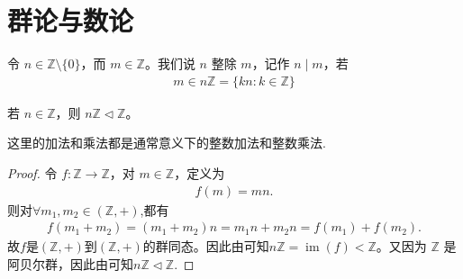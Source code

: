 \documentclass[../../main.tex]{subfiles}
\begin{document}
\section{群论与数论}

\begin{definition}[整除]
令 $n\in \mathbb{Z}\setminus\{0\}$，而 $m\in \mathbb{Z}$。我们说 $n$ 整除 $m$，记作 $n\mid m$，若
\begin{align*}
m\in n\mathbb{Z}=\{kn:k\in\mathbb{Z}\}
\end{align*} 
\end{definition}

\begin{proposition}\label{proposition:nZ是Z的正规子群}
若 $n\in\mathbb{Z}$，则 $n\mathbb{Z}\lhd\mathbb{Z}$。
\end{proposition}
\begin{remark}
这里的加法和乘法都是通常意义下的整数加法和整数乘法.
\end{remark}
\begin{proof}
令 $f:\mathbb{Z}\to \mathbb{Z}$，对 $m\in\mathbb{Z}$，定义为
\begin{align*}
f(m)=mn.
\end{align*}
则对$\forall m_1,m_2\in (\mathbb{Z},+)$,都有 
\begin{align*}
f\left( m_1+m_2 \right) =\left( m_1+m_2 \right) n=m_1n+m_2n=f\left( m_1 \right) +f\left( m_2 \right) .
\end{align*}
故$f$是$(\mathbb{Z},+)$到$(\mathbb{Z},+)$的群同态。因此由可知$n\mathbb{Z}=\operatorname{im}(f)<\mathbb{Z}$。又因为 $\mathbb{Z}$ 是阿贝尔群，因此由可知$n\mathbb{Z}\lhd\mathbb{Z}$.
\end{proof}
\end{document}
